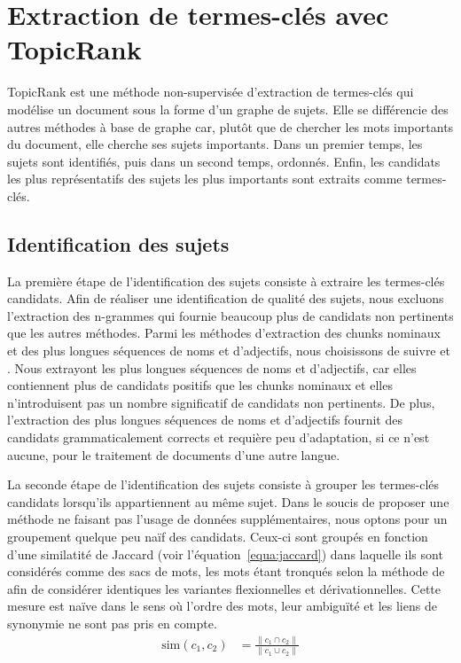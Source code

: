 \section{Extraction de termes-clés avec TopicRank}
\label{sec:extraction_de_termes_cles_avec_topicrank}
  TopicRank est une méthode non-supervisée d'extraction de termes-clés qui
  modélise un document sous la forme d'un graphe de sujets.
  Elle se différencie des autres méthodes à base de graphe car, plutôt que de
  chercher les mots importants du document, elle cherche ses sujets importants.
  Dans un premier temps, les sujets sont identifiés, puis dans un second temps,
  ordonnés. Enfin, les candidats les plus représentatifs des sujets les plus
  importants sont extraits comme termes-clés.

  \subsection{Identification des sujets}
  \label{subsec:identification_des_sujets}
    La première étape de l'identification des sujets consiste à extraire les
    termes-clés candidats.
    Afin de réaliser une identification de qualité des sujets, nous excluons
    l'extraction des n-grammes qui fournie beaucoup plus de candidats non
    pertinents que les autres méthodes. Parmi les méthodes d'extraction des
    chunks nominaux et des plus longues séquences de noms et d'adjectifs, nous
    choisissons de suivre  et
    . Nous extrayont les plus longues séquences de
    noms et d'adjectifs, car elles contiennent plus de candidats positifs que
    les chunks nominaux et elles n'introduisent pas un nombre significatif de
    candidats non pertinents. De plus, l'extraction des plus longues séquences
    de noms et d'adjectifs fournit des candidats grammaticalement corrects et
    requière peu d'adaptation, si ce n'est aucune, pour le traitement de
    documents d'une autre langue.

    La seconde étape de l'identification des sujets consiste à grouper les
    termes-clés candidats lorsqu'ils appartiennent au même sujet.
    Dans le soucis de proposer une méthode ne faisant pas l'usage de données
    supplémentaires, nous optons pour un groupement quelque peu naïf des
    candidats. Ceux-ci sont groupés en fonction d'une similatité de Jaccard
    (voir l'équation~\ref{equa:jaccard}) dans laquelle ils sont considérés comme
    des sacs de mots, les mots étant tronqués selon la méthode de
     afin de considérer identiques les
    variantes flexionnelles et dérivationnelles. Cette mesure est naïve dans le
    sens où l'ordre des mots, leur ambiguïté et les liens de synonymie ne sont
    pas pris en compte.
    \begin{align}
      \text{sim}(c_1, c_2) &= \frac{\|c_1 \cap c_2\|}{\|c_1 \cup c_2\|} \label{equa:jaccard}
    \end{align}

